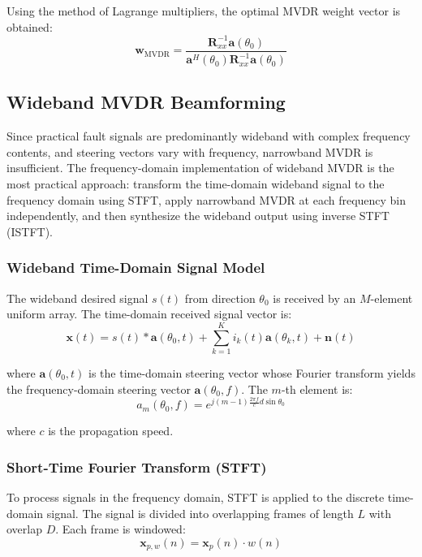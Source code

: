 \documentclass[journal]{IEEEtran}
\begin{document}
Using the method of Lagrange multipliers, the optimal MVDR weight vector is obtained:
\begin{equation}
\boldsymbol{w}_{\text{MVDR}} = \frac{\boldsymbol{R}_{xx}^{-1}\boldsymbol{a}(\theta_0)}{\boldsymbol{a}^H(\theta_0)\boldsymbol{R}_{xx}^{-1}\boldsymbol{a}(\theta_0)}
\end{equation}

\subsection{Wideband MVDR Beamforming}
Since practical fault signals are predominantly wideband with complex frequency contents, and steering vectors vary with frequency, narrowband MVDR is insufficient. The frequency-domain implementation of wideband MVDR is the most practical approach: transform the time-domain wideband signal to the frequency domain using STFT, apply narrowband MVDR at each frequency bin independently, and then synthesize the wideband output using inverse STFT (ISTFT).

\subsubsection{Wideband Time-Domain Signal Model}
The wideband desired signal $s(t)$ from direction $\theta_0$ is received by an $M$-element uniform array. The time-domain received signal vector is:
\begin{equation}
\boldsymbol{x}(t) = s(t) * \boldsymbol{a}(\theta_0, t) + \sum_{k=1}^{K} i_k(t)\boldsymbol{a}(\theta_k, t) + \boldsymbol{n}(t)
\end{equation}

where $\boldsymbol{a}(\theta_0, t)$ is the time-domain steering vector whose Fourier transform yields the frequency-domain steering vector $\boldsymbol{a}(\theta_0, f)$. The $m$-th element is:
\begin{equation}
a_{m}(\theta_0, f) = e^{j(m-1)\frac{2\pi f}{c}d\sin\theta_0}
\end{equation}

where $c$ is the propagation speed.

\subsubsection{Short-Time Fourier Transform (STFT)}
To process signals in the frequency domain, STFT is applied to the discrete time-domain signal. The signal is divided into overlapping frames of length $L$ with overlap $D$. Each frame is windowed:
\begin{equation}
\boldsymbol{x}_{p,w}(n) = \boldsymbol{x}_p(n) \cdot w(n)
\end{equation}
\end{document}
